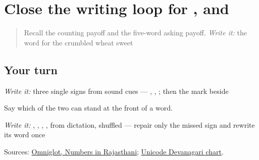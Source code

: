 \section[Practice]{Close the writing loop for ,  and }

\label{lesson:MW-R32-script-close}



\begin{quote}
Recall the counting payoff and the five-word asking payoff. \emph{Write it:} the word for the crumbled wheat sweet
\end{quote}

\subsection*{Your turn}
\emph{Write it:} three single signs from sound cues — \textbf{}, \textbf{}, \textbf{}; then the mark \textbf{} beside \textbf{}

Say which of the two can stand at the front of a word.

\emph{Write it:} \textbf{}, \textbf{}, \textbf{}, \textbf{}, \textbf{} from dictation, shuffled — repair only the missed sign and rewrite its word once

\begin{tcolorbox}[breakable,colback=teal!4,colframe=teal!35!black,title={Before you move on}]
Sources: \href{https://www.omniglot.com/language/numbers/rajasthani.htm}{Omniglot, Numbers in Rajasthani}; \href{https://www.unicode.org/charts/PDF/U0900.pdf}{Unicode Devanagari chart}.
\end{tcolorbox}
